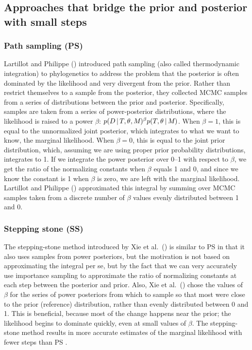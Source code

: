 \subsection{Approaches that bridge the prior and posterior with small steps}

\subsubsection{Path sampling (PS)}
Lartillot and Philippe (\citeyear{Lartillot2006}) introduced path sampling
(also called thermodynamic integration) to phylogenetics to address the problem
that the posterior is often dominated by the likelihood and very divergent from
the prior.
Rather than restrict themselves to a sample from the posterior, they collected
MCMC samples from a series of distributions between the prior and posterior.
Specifically, samples are taken from a series of power-posterior distributions,
where the likelihood is raised to a power $\beta$:
$ p(D \,|\, T, \theta_{}, M_{})^{\beta}
p(T, \theta_{} \,|\, M_{})$.
When $\beta = 1$, this is equal to the unnormalized joint posterior, which
integrates to what we want to know, the marginal likelihood.
When $\beta = 0$, this is equal to the joint prior distribution, which,
assuming we are using proper prior probability distributions, integrates to 1.
If we integrate the power posterior over 0--1 with respect to $\beta$, we get
the ratio of the normalizing constants when $\beta$ equals 1 and 0, and since
we know the constant is 1 when $\beta$ is zero, we are left with the marginal
likelihood.
Lartillot and Philippe (\citeyear{Lartillot2006}) approximated this integral by
summing over MCMC samples taken from a discrete number of $\beta$ values evenly
distributed between 1 and 0.

\subsubsection{Stepping stone (SS)}
The stepping-stone method introduced by Xie et al.\ (\citeyear{Xie2011})
is similar to PS in that it also uses samples from power posteriors, but the
motivation is not based on approximating the integral per se, but by
the fact that we can very accurately use importance sampling to approximate the
ratio of normalizing constants at each step between the posterior and prior.
Also, Xie et al.\ (\citeyear{Xie2011}) chose the values of $\beta$ for the
series of power posteriors from which to sample so that most were close to
the prior (reference) distribution, rather than evenly distributed between
0 and 1.
This is beneficial, because most of the change happens near the prior; the
likelihood begins to dominate quickly, even at small values of $\beta$.
The stepping-stone method results in more accurate estimates of the marginal
likelihood with fewer steps than PS \citep{Xie2011}.

